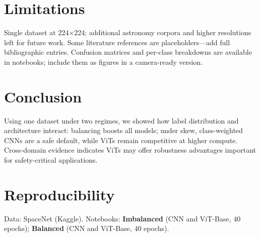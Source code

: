\section{Limitations}
Single dataset at 224\(\times\)224; additional astronomy corpora and higher resolutions left for future work. Some literature references are placeholders—add full bibliographic entries. Confusion matrices and per-class breakdowns are available in notebooks; include them as figures in a camera-ready version.

\section{Conclusion}
Using one dataset under two regimes, we showed how label distribution and architecture interact: balancing boosts all models; under skew, class-weighted CNNs are a safe default, while ViTs remain competitive at higher compute. Cross-domain evidence indicates ViTs may offer robustness advantages important for safety-critical applications.

\section*{Reproducibility}
Data: SpaceNet (Kaggle)\cite{SpaceNetKaggle}. 
Notebooks: \textbf{Imbalanced} (CNN and ViT-Base, 40 epochs)\cite{Gothi_ImbalCNN40_2025,Gothi_ImbalViTBase40_2025}; 
\textbf{Balanced} (CNN and ViT-Base, 40 epochs)\cite{Gothi_BalEfficientNet40_2025,Gothi_BalViTBase40_2025}. 





